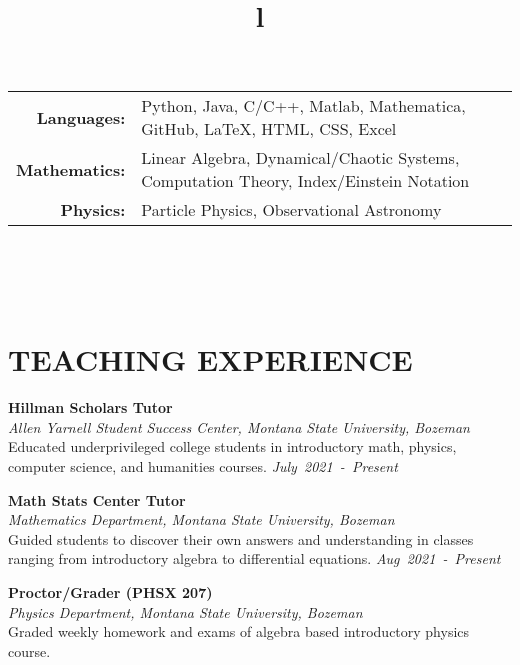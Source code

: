 \documentclass[margin]{res}
\begin{document}
\begin{resume}
{
\begin{tabular}{r p{9.5cm}}
\textbf{Languages:}   & Python, Java, C/C++, Matlab, Mathematica, GitHub, LaTeX, HTML, CSS, Excel \vspace{0.5ex}\\
\textbf{Mathematics:} & Linear Algebra, Dynamical/Chaotic Systems, Computation Theory, Index/Einstein Notation \vspace{0.5ex} \\
\textbf{Physics:}     & Particle Physics, Observational Astronomy   \\
\end{tabular}
}




\begin{format}
\title{l}\\
\\
\body\\
\end{format}

\section{TEACHING EXPERIENCE}
\noindent
\textbf{Hillman Scholars Tutor}\\
{\sl Allen Yarnell Student Success Center, Montana State University, Bozeman}\\\vspace{0.5ex}
Educated underprivileged college students in introductory math, physics, computer science, and humanities courses. \hfill
{\sl July~2021~-~Present}

\noindent
\raggedright
\textbf{Math Stats Center Tutor}\\
{\sl Mathematics Department, Montana State University, Bozeman}\\\vspace{0.5ex}
Guided students to discover their own answers and understanding in classes ranging from introductory algebra to differential equations. \hfill
{\sl Aug~2021~-~Present}

\noindent
\raggedright
\textbf{Proctor/Grader (PHSX 207)}\\
{\sl Physics Department, Montana State University, Bozeman}\\\vspace{0.5ex}
Graded weekly homework and exams of algebra based introductory physics course.\\


\end{resume}
\end{document}
